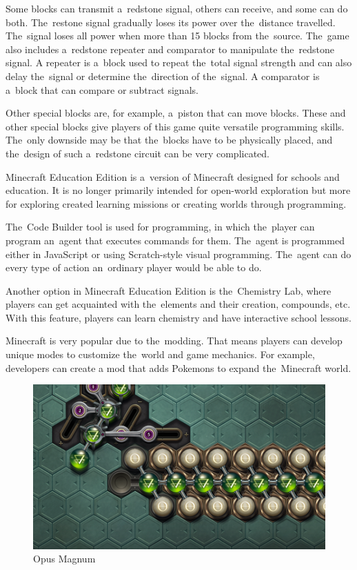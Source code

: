 Some blocks can transmit a~redstone signal, others can receive, and some can do both.
The~restone signal gradually loses its power over the~distance travelled.
The~signal loses all power when more than 15 blocks from the~source.
The~game also includes a~redstone repeater and comparator to manipulate the~redstone signal.
A repeater is a~block used to repeat the~total signal strength and can also delay the~signal or determine the~direction of the~signal.
A comparator is a~block that can compare or subtract signals.

\pagebreak
Other special blocks are, for example, a~piston that can move blocks.
These and other special blocks give players of this game quite versatile programming skills.
The~only downside may be that the~blocks have to be physically placed, and the~design of such a~redstone circuit can be very complicated.

Minecraft Education Edition is a~version of Minecraft designed for schools and education.
It is no longer primarily intended for open-world exploration but more for exploring created learning missions or creating worlds through programming.

The~Code Builder tool is used for programming, in which the~player can program an~agent that executes commands for them.
The~agent is programmed either in JavaScript or using Scratch-style visual programming.
The~agent can do every type of action an~ordinary player would be able to do.

Another option in Minecraft Education Edition is the~Chemistry Lab, where players can get acquainted with the~elements and their creation, compounds, etc.
With this feature, players can learn chemistry and have interactive school lessons.

Minecraft is very popular due to the~modding.
That means players can develop unique modes to customize the~world and game mechanics.
For example, developers can create a mod that adds Pokemons to expand the~Minecraft world.

\begin{figure}
    \centering
    \includegraphics[width=1\linewidth]{assets/similar-games/opusmagnum.png}
    \caption{Opus Magnum~\cite{a2022_zachtronics}}
    \label{fig:opusmagnum}
\end{figure}

